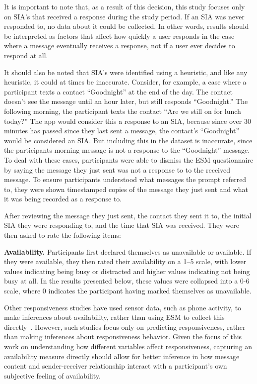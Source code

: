 \documentclass[12pt]{nuthesis}	%
\begin{document}
It is important to note that, as a result of this decision, this study focuses only on SIA's that received a response during the study period. If an SIA was never responded to, no data about it could be collected. In other words, results should be interpreted as factors that affect how quickly a user responds in the case where a message eventually receives a response, not if a user ever decides to respond at all.

It should also be noted that SIA's were identified using a heuristic, and like any heuristic, it could at times be inaccurate. Consider, for example, a case where a participant texts a contact ``Goodnight'' at the end of the day. The contact doesn't see the message until an hour later, but still responds ``Goodnight.'' The following morning, the participant texts the contact ``Are we still on for lunch today?'' The app would consider this a response to an SIA, because since over 30 minutes has passed since they last sent a message, the contact's ``Goodnight'' would be considered an SIA. But including this in the dataset is inaccurate, since the participants morning message is not a response to the ``Goodnight'' message. To deal with these cases, participants were able to dismiss the ESM questionnaire by saying the message they just sent was not a response to to the received message. To ensure participants understood what messages the prompt referred to, they were shown timestamped copies of the message they just sent and what it was being recorded as a response to.

After reviewing the message they just sent, the contact they sent it to, the initial SIA they were responding to, and the time that SIA was received. They were then asked to rate the following items:

\textbf{Availability.} Participants first declared themselves as unavailable or available. If they were available, they then rated their availability on a 1--5 scale, with lower values indicating being busy or distracted and higher values indicating not being busy at all. In the results presented below, these values were collapsed into a 0-6 scale, where 0 indicates the participant having marked themselves as unavailable.

Other responsiveness studies have used sensor data, such as phone activity, to make inferences about availability, rather than using ESM to collect this directly~\citep[e.g.,][]{pielot2014didn}. However, such studies focus only on predicting responsiveness, rather than making inferences about responsiveness behavior. Given the focus of this work on understanding how different variables affect responsiveness, capturing an availability measure directly should allow for better inference in how message content and sender-receiver relationship interact with a participant's own subjective feeling of availability.
\end{document}
